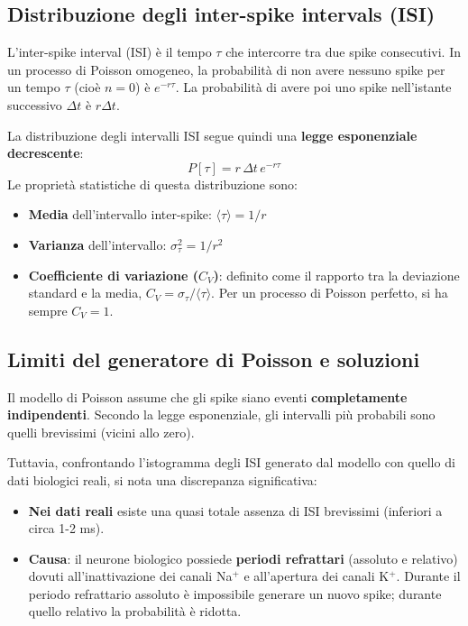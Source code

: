 \subsection{Distribuzione degli inter-spike intervals (ISI)}
L'inter-spike interval (ISI) è il tempo $\tau$ che intercorre tra due spike consecutivi. In un processo di Poisson omogeneo, la probabilità di non avere nessuno spike per un tempo $\tau$ (cioè $n=0$) è $e^{-r\tau}$. La probabilità di avere poi uno spike nell'istante successivo $\Delta t$ è $r\Delta t$. 

La distribuzione degli intervalli ISI segue quindi una \textbf{legge esponenziale decrescente}:
\begin{equation}
P[\tau] = r\,\Delta t\, e^{-r\tau}
\label{eq:isi_exp}
\end{equation}
Le proprietà statistiche di questa distribuzione sono:
\begin{itemize}
    \item \textbf{Media} dell'intervallo inter-spike: $\langle \tau \rangle = 1/r$
    \item \textbf{Varianza} dell'intervallo: $\sigma_\tau^2 = 1/r^2$
    \item \textbf{Coefficiente di variazione ($C_V$)}: definito come il rapporto tra la deviazione standard e la media, $C_V = \sigma_\tau / \langle \tau \rangle$. Per un processo di Poisson perfetto, si ha sempre \textbf{$C_V = 1$}.
\end{itemize}

\subsection{Limiti del generatore di Poisson e soluzioni}
Il modello di Poisson assume che gli spike siano eventi \textbf{completamente indipendenti}. Secondo la legge esponenziale, gli intervalli più probabili sono quelli brevissimi (vicini allo zero).

Tuttavia, confrontando l'istogramma degli ISI generato dal modello con quello di dati biologici reali, si nota una discrepanza significativa:
\begin{itemize}
    \item \textbf{Nei dati reali} esiste una quasi totale assenza di ISI brevissimi (inferiori a circa 1-2 ms).
    \item \textbf{Causa}: il neurone biologico possiede \textbf{periodi refrattari} (assoluto e relativo) dovuti all'inattivazione dei canali Na$^+$ e all'apertura dei canali K$^+$. Durante il periodo refrattario assoluto è impossibile generare un nuovo spike; durante quello relativo la probabilità è ridotta.
\end{itemize}

